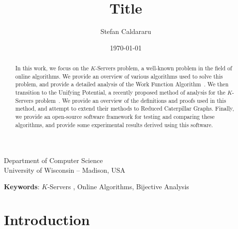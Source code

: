 \documentclass[11pt]{article}
\title{Title}
\author[1]{Stefan Caldararu}
\affil[1]{Undergraduate Student with Department of Computer Science, UW-Madison}
\date{\today}                     %
\newcommand{\KS}{$K$-Servers }
\theoremstyle{definition}
\begin{document}
\maketitle

\begin{center}
	Department of Computer Science\\
	University of Wisconsin -- Madison, USA
\end{center}
\vspace{1.5in}
\begin{abstract} 
	In this work, we focus on the \KS problem, a well-known problem in the field of online algorithms. We provide an overview of various algorithms used to solve this problem, and provide a detailed analysis of the Work Function Algorithm~\cite{KS1990, OnlineComp1998}. We then transition to the Unifying Potential, a recently proposed method of analysis for the \KS problem~\cite{unifyingPotential2021}. We provide an overview of the definitions and proofs used in this method, and attempt to extend their methods to Reduced Caterpillar Graphs. Finally, we provide an open-source software framework for testing and comparing these algorithms, and provide some experimental results derived using this software.
\end{abstract}

{\textbf{Keywords}}: \KS, Online Algorithms, Bijective Analysis

\newpage 
\tableofcontents

\newpage

\section{Introduction}
\label{sec:intro}

\end{document}
